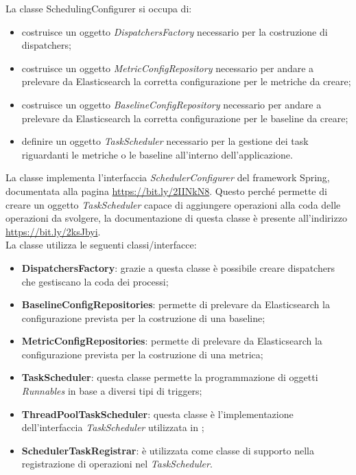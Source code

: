         La classe SchedulingConfigurer si occupa di:
        \begin{itemize}
        	\item costruisce un oggetto \textit{DispatchersFactory} necessario per la costruzione di dispatchers;
        	\item costruisce un oggetto \textit{MetricConfigRepository} necessario per andare a prelevare da 
        		Elasticsearch la corretta configurazione per le metriche da creare;
        	\item costruisce un oggetto \textit{BaselineConfigRepository} necessario per andare a prelevare da 
        		Elasticsearch la corretta configurazione per le baseline da creare;
        	\item definire un oggetto \textit{TaskScheduler} necessario per la gestione dei task riguardanti
        		le metriche o le baseline all'interno dell'applicazione.
        \end{itemize}
        La classe implementa l'interfaccia \textit{SchedulerConfigurer} del framework Spring, documentata alla pagina
        \url{https://bit.ly/2IINkN8}. Questo perché permette di creare un oggetto \textit{TaskScheduler}
        capace di aggiungere operazioni alla coda delle operazioni da svolgere, la documentazione di questa 
        classe è presente all'indirizzo \url{https://bit.ly/2ksJbyi}. \\
        La classe utilizza le seguenti classi/interfacce:
        \begin{itemize}
        	\item \textbf{DispatchersFactory}: grazie a questa classe è possibile creare dispatchers che gestiscano la coda
        		dei processi;
        	\item \textbf{BaselineConfigRepositories}: permette di prelevare da Elasticsearch la configurazione prevista
        		per la costruzione di una baseline;
        	\item \textbf{MetricConfigRepositories}: permette di prelevare da Elasticsearch la configurazione prevista
        		per la costruzione di una metrica;
        	\item \textbf{TaskScheduler}: questa classe permette la programmazione di oggetti \textit{Runnables} in
        		base a diversi tipi di triggers;
        	\item \textbf{ThreadPoolTaskScheduler}: questa classe è l'implementazione dell'interfaccia \textit{TaskScheduler} 
				utilizzata in \ProjectName{};
        	\item \textbf{SchedulerTaskRegistrar}: è utilizzata come classe di supporto nella registrazione di 
        		operazioni nel \textit{TaskScheduler}.
        \end{itemize}
		
		
	
	    
